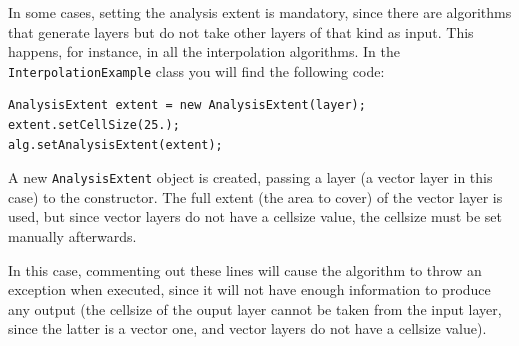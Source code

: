 In some cases, setting the analysis extent is mandatory, since there are algorithms that generate layers but do not take other layers of that kind as input. This happens, for instance, in all the interpolation algorithms. In the \texttt{InterpolationExample} class you will find the following code:

\begin{verbatim}
AnalysisExtent extent = new AnalysisExtent(layer);
extent.setCellSize(25.);
alg.setAnalysisExtent(extent);
\end{verbatim}

A new \texttt{AnalysisExtent} object is created, passing a layer (a vector layer in this case) to the constructor. The full extent (the area to cover) of the vector layer is used, but since vector layers do not have a cellsize value, the cellsize must be set manually afterwards. 

In this case, commenting out these lines will cause the algorithm to throw an exception when executed, since it will not have enough information to produce any output (the cellsize of the ouput layer cannot be taken from the input layer, since the latter is a vector one, and vector layers do not have a cellsize value).

